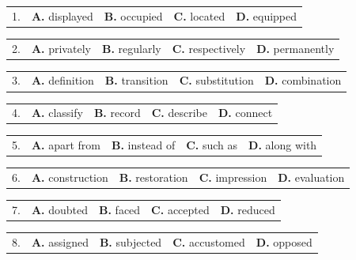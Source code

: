\documentclass[UTF8,11pt]{ctexart}
\begin{document}
\noindent\begin{tabularx}{\linewidth}{@{}lXXXX@{}}1. & \textbf{A.} displayed & \textbf{B.} occupied & \textbf{C.} located & \textbf{D.} equipped\\\end{tabularx}\par

\noindent\begin{tabularx}{\linewidth}{@{}lXXXX@{}}2. & \textbf{A.} privately & \textbf{B.} regularly & \textbf{C.} respectively & \textbf{D.} permanently\\\end{tabularx}\par

\noindent\begin{tabularx}{\linewidth}{@{}lXXXX@{}}3. & \textbf{A.} definition & \textbf{B.} transition & \textbf{C.} substitution & \textbf{D.} combination\\\end{tabularx}\par

\noindent\begin{tabularx}{\linewidth}{@{}lXXXX@{}}4. & \textbf{A.} classify & \textbf{B.} record & \textbf{C.} describe & \textbf{D.} connect\\\end{tabularx}\par

\noindent\begin{tabularx}{\linewidth}{@{}lXXXX@{}}5. & \textbf{A.} apart from & \textbf{B.} instead of & \textbf{C.} such as & \textbf{D.} along with\\\end{tabularx}\par

\noindent\begin{tabularx}{\linewidth}{@{}lXXXX@{}}6. & \textbf{A.} construction & \textbf{B.} restoration & \textbf{C.} impression & \textbf{D.} evaluation\\\end{tabularx}\par

\noindent\begin{tabularx}{\linewidth}{@{}lXXXX@{}}7. & \textbf{A.} doubted & \textbf{B.} faced & \textbf{C.} accepted & \textbf{D.} reduced\\\end{tabularx}\par

\noindent\begin{tabularx}{\linewidth}{@{}lXXXX@{}}8. & \textbf{A.} assigned & \textbf{B.} subjected & \textbf{C.} accustomed & \textbf{D.} opposed\\\end{tabularx}\par
\end{document}
